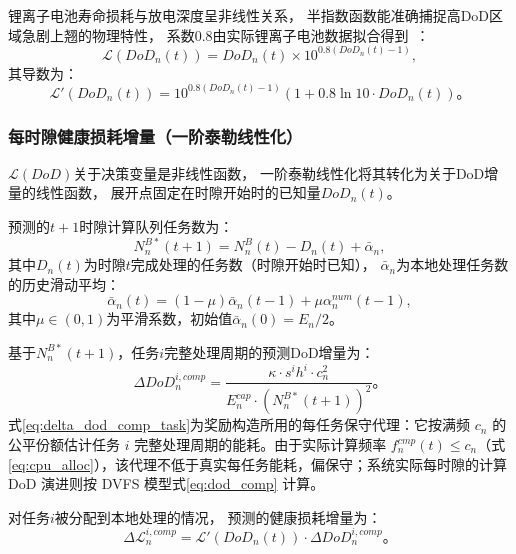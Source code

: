 \documentclass[a4paper,11pt]{article}
\begin{document}
锂离子电池寿命损耗与放电深度呈非线性关系，
半指数函数能准确捕捉高DoD区域急剧上翘的物理特性，
系数0.8由实际锂离子电池数据拟合得到~\cite{chen2025tasri}：
\begin{equation}
    \mathcal{L}(DoD_n(t)) = DoD_n(t) \times
    10^{0.8(DoD_n(t)-1)},
    \label{eq:health_loss}
\end{equation}
其导数为：
\begin{equation}
    \mathcal{L}'(DoD_n(t)) = 10^{0.8(DoD_n(t)-1)}
    \left(1 + 0.8\ln 10 \cdot DoD_n(t)\right)。
    \label{eq:health_loss_deriv}
\end{equation}

\subsubsection{每时隙健康损耗增量（一阶泰勒线性化）}

$\mathcal{L}(DoD)$关于决策变量是非线性函数，
一阶泰勒线性化将其转化为关于DoD增量的线性函数，
展开点固定在时隙开始时的已知量$DoD_n(t)$。

预测的$t+1$时隙计算队列任务数为：
\begin{equation}
    N^{B*}_n(t+1) = N^B_n(t) - D_n(t) + \bar{\alpha}_n,
    \label{eq:QB_predict}
\end{equation}
其中$D_n(t)$为时隙$t$完成处理的任务数（时隙开始时已知），
$\bar{\alpha}_n$为本地处理任务数的历史滑动平均：
\begin{equation}
    \bar{\alpha}_n(t) = (1-\mu)\bar{\alpha}_n(t-1)
    + \mu\alpha^{num}_n(t-1),
    \label{eq:alpha_avg}
\end{equation}
其中$\mu \in (0,1)$为平滑系数，初始值$\bar{\alpha}_n(0) = E_n/2$。

基于$N^{B*}_n(t+1)$，任务$i$完整处理周期的预测DoD增量为：
\begin{equation}
    \Delta DoD^{i,comp}_n =
    \frac{\kappa \cdot s^i h^i \cdot c^2_n}
    {E^{cap}_n \cdot \left(N^{B*}_n(t+1)\right)^2}。
    \label{eq:delta_dod_comp_task}
\end{equation}
式\eqref{eq:delta_dod_comp_task}为奖励构造所用的每任务保守代理：它按满频 $c_n$ 的公平份额估计任务 $i$ 完整处理周期的能耗。由于实际计算频率 $f^{cmp}_n(t)\le c_n$（式\eqref{eq:cpu_alloc}），该代理不低于真实每任务能耗，偏保守；系统实际每时隙的计算 DoD 演进则按 DVFS 模型式\eqref{eq:dod_comp} 计算。

对任务$i$被分配到本地处理的情况，
预测的健康损耗增量为：
\begin{equation}
    \Delta\mathcal{L}^{i,comp}_n =
    \mathcal{L}'(DoD_n(t)) \cdot
    \Delta DoD^{i,comp}_n。
    \label{eq:delta_L_comp}
\end{equation}
\end{document}
